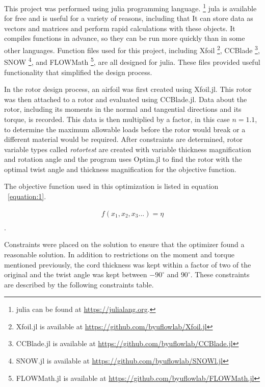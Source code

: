 \documentclass[journal ]{new-aiaa}
\begin{document}
This project was performed using julia programming language. \footnote{julia can be found at \url{https://julialang.org}.} jula is available for free and is useful for a variety of reasons, including that It can store data as vectors and matrices and perform rapid calculations with these objects. It compiles functions in advance, so they can be run more quickly than in some other languages. Function files used for this project, including Xfoil \footnote{Xfoil.jl is available at \url{https://github.com/byuflowlab/Xfoil.jl}}, CCBlade \footnote{CCBlade.jl is available at \url{https://github.com/byuflowlab/CCBlade.jl}}, SNOW \footnote{SNOW.jl is available at \url{https://github.com/byuflowlab/SNOWl.jl}}, and FLOWMath \footnote{FLOWMath.jl is available at \url{https://github.com/byuflowlab/FLOWMath.jl}}, are all designed for julia. These files provided useful functionality that simplified the design process.

In the rotor design process, an airfoil was first created using Xfoil.jl. This rotor was then attached to a rotor and evaluated using CCBlade.jl. Data about the rotor, including its moments in the normal and tangential directions and its torque, is recorded. This data is then multiplied by a factor, in this case $n=1.1$, to determine the maximum allowable loads before the rotor would break or a different material would be required. After constraints are determined, rotor variable types called \emph{rotortest} are created with variable thickness magnification and rotation angle and the program uses Optim.jl to find the rotor with the optimal twist angle and thickness magnification for the objective function.

The objective function used in this optimization is listed in equation ~\eqref{equation:1}. 

\begin{equation}
	\begin{aligned}
	\label{equation:1}
	f(x_{1}, x_{2}, x_{3}...) = \eta \\
	\end{aligned}
\end{equation}.

Constraints were placed on the solution to ensure that the optimizer found a reasonable solution. In addition to restrictions on the moment and torque mentioned previously, the cord thickness was kept within a factor of two of the original and the twist angle was kept between $-90^{\circ}$ and $90^{\circ}$. These constraints are described by the following constraints table.
\end{document}
